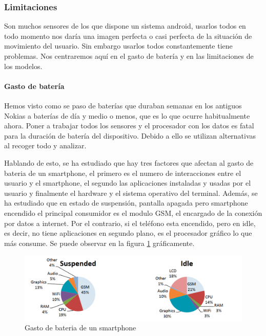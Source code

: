 \documentclass[12pt]{article}
\numberwithin{equation}{section}
\begin{document}
\subsubsection{Limitaciones}

Son muchos sensores de los que dispone un sistema android, usarlos todos en todo momento nos daría una imagen perfecta o casi perfecta de la situación de movimiento del usuario. Sin embargo usarlos todos constantemente tiene problemas. Nos centraremos aquí en el gasto de batería y en las limitaciones de los modelos.

\paragraph{Gasto de batería}
Hemos visto como se paso de baterías que duraban semanas en los antiguos Nokias a baterías de día y medio o menos, que es lo que ocurre habitualmente ahora. Poner a trabajar todos los sensores y el procesador con los datos es fatal para la duración de batería del dispositivo. Debido a ello se utilizan alternativas al recoger todo y analizar. 

Hablando de esto, se ha estudiado que hay tres factores que afectan al gasto de bateria de un smartphone, el primero es el numero de interacciones entre el usuario y el smartphone, el segundo las aplicaciones instaladas y usadas por el usuario y finalmente el hardware y el sistema operativo del terminal\cite{Falaki:2010:DSU:1814433.1814453}. Además, se ha estudiado que en estado de suspensión, pantalla apagada pero smartphone encendido el principal consumidor es el modulo GSM, el encargado de la conexión por datos a internet. Por el contrario, si el teléfono esta encendido, pero en idle, es decir, no tiene aplicaciones en segundo plano, es el procesador gráfico lo que más consume\cite{Carroll:2010:APC:1855840.1855861}. Se puede observar en la figura \ref{fig:consumo} gráficamente.
\begin{figure}[h]
    \centering
    \includegraphics[width=1\textwidth]{batterylife.png}
    \caption{Gasto de bateria de un smartphone\cite{Carroll:2010:APC:1855840.1855861}}
    \label{fig:consumo}
\end{figure}
\end{document}
